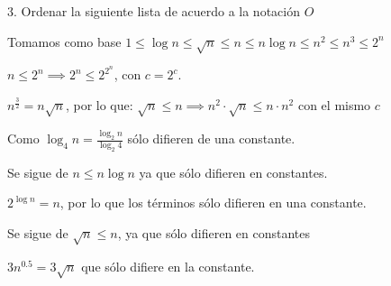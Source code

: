 \begin{ejercicio}{
3. Ordenar la siguiente lista de acuerdo a la notación $O$}

Tomamos como base
$1 \leq \log n \leq \sqrt{n} \leq n \leq n \log n \leq n^2 \leq n^3 \leq 2^n$

\vspace*{10mm}

\begin{description}[
  font=$\bullet$ \scshape\normalfont\mathversion{bold}]

\item[$2^{n} \leq 2^{2^n}$:]
$n \leq 2^n \implies  2^n \leq 2^{2^n}$, con $c = 2^c$.

\item[$n^3 \leq 2^{n}$]

\item[$4n^{\frac{3}{2}} \leq n^3$:]
$n^{\frac{3}{2}} = n\sqrt{n}$, por lo que:
$\sqrt{n} \leq n \implies
n^2 \cdot \sqrt{n} \leq n\cdot n^2$  con el mismo $c$

\item[$2 n \log^2 n \leq 4n^{\frac{3}{2}}$:]

\item[$6n \log_2 n \leq 2 n \log^2 n$:]

\item[$6n \log_2 n \equiv n \log_4 n$:]
Como $\log_4 n = \frac{\log_2 n}{\log_2 4}$ sólo difieren de una constante.

\item[$5n \leq 6n \log_2 n$:]
Se sigue de $n \leq n \log n$ ya que sólo difieren en constantes.

\item[$2^{\log n} \equiv 5n$:]
$2^{\log n} = n$, por lo que los términos sólo difieren en una constante.

\item[$\sqrt{n} \leq 5n $:]
Se sigue de $\sqrt{n} \leq n$, ya que sólo difieren en constantes

\item[$3n^{0,5} \equiv \sqrt{n}$:]
$3n^{0.5} = 3\sqrt{n}$ que sólo difiere en la constante.

\item[$n^{0,01} \leq \sqrt{n} $:]


\item[$\log^2 n \leq n^{0,01}$:]

\item[$\log \log n \leq \log^2 n $:]

\item[$\frac{1}{n} \leq \log \log n $:]

\end{description}
\end{ejercicio}
